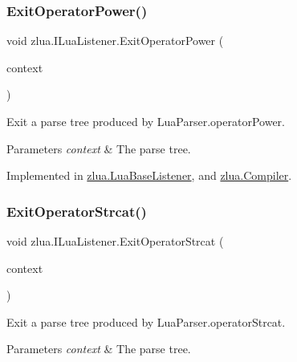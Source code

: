 \subsubsection{\texorpdfstring{Exit\+Operator\+Power()}{ExitOperatorPower()}}
{\footnotesize\ttfamily void zlua.\+I\+Lua\+Listener.\+Exit\+Operator\+Power (\begin{DoxyParamCaption}\item[{\mbox{[}\+Not\+Null\mbox{]} \mbox{\hyperlink{classzlua_1_1_lua_parser_1_1_operator_power_context}{Lua\+Parser.\+Operator\+Power\+Context}}}]{context }\end{DoxyParamCaption})}



Exit a parse tree produced by Lua\+Parser.\+operator\+Power. 


\begin{DoxyParams}{Parameters}
{\em context} & The parse tree.\\
\hline
\end{DoxyParams}


Implemented in \mbox{\hyperlink{classzlua_1_1_lua_base_listener_aed60ef8f2e3a221a83c9b5be20dcc8c0}{zlua.\+Lua\+Base\+Listener}}, and \mbox{\hyperlink{classzlua_1_1_compiler_a5c623270aa4a3005cf103f95ff8566a7}{zlua.\+Compiler}}.

\mbox{\label{interfacezlua_1_1_i_lua_listener_a9b0c6b0efb7d5c405477117f0df532fa}} 
\subsubsection{\texorpdfstring{Exit\+Operator\+Strcat()}{ExitOperatorStrcat()}}
{\footnotesize\ttfamily void zlua.\+I\+Lua\+Listener.\+Exit\+Operator\+Strcat (\begin{DoxyParamCaption}\item[{\mbox{[}\+Not\+Null\mbox{]} \mbox{\hyperlink{classzlua_1_1_lua_parser_1_1_operator_strcat_context}{Lua\+Parser.\+Operator\+Strcat\+Context}}}]{context }\end{DoxyParamCaption})}



Exit a parse tree produced by Lua\+Parser.\+operator\+Strcat. 


\begin{DoxyParams}{Parameters}
{\em context} & The parse tree.\\
\hline
\end{DoxyParams}


